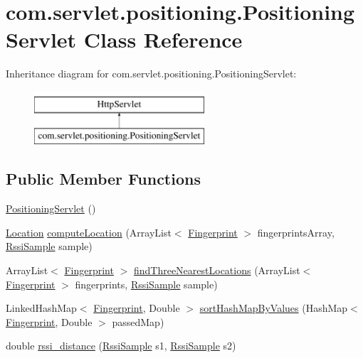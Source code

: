 \hypertarget{classcom_1_1servlet_1_1positioning_1_1_positioning_servlet}{}\section{com.\+servlet.\+positioning.\+Positioning\+Servlet Class Reference}
\label{classcom_1_1servlet_1_1positioning_1_1_positioning_servlet}
Inheritance diagram for com.\+servlet.\+positioning.\+Positioning\+Servlet\+:\begin{figure}[H]
\begin{center}
\leavevmode
\includegraphics[height=2.000000cm]{classcom_1_1servlet_1_1positioning_1_1_positioning_servlet}
\end{center}
\end{figure}
\subsection*{Public Member Functions}
\begin{DoxyCompactItemize}
\item 
\hyperlink{classcom_1_1servlet_1_1positioning_1_1_positioning_servlet_a9db4dd4f8aedc0ab1cac3e3e176aa8d1}{Positioning\+Servlet} ()
\item 
\hyperlink{classcom_1_1servlet_1_1utilities_1_1_location}{Location} \hyperlink{classcom_1_1servlet_1_1positioning_1_1_positioning_servlet_acfcf3108d3987e97c3987bed9dc7dbbc}{compute\+Location} (Array\+List$<$ \hyperlink{classcom_1_1servlet_1_1utilities_1_1_fingerprint}{Fingerprint} $>$ fingerprints\+Array, \hyperlink{classcom_1_1servlet_1_1utilities_1_1_rssi_sample}{Rssi\+Sample} sample)
\item 
Array\+List$<$ \hyperlink{classcom_1_1servlet_1_1utilities_1_1_fingerprint}{Fingerprint} $>$ \hyperlink{classcom_1_1servlet_1_1positioning_1_1_positioning_servlet_ad8301771d7378366e179f22db3ceca37}{find\+Three\+Nearest\+Locations} (Array\+List$<$ \hyperlink{classcom_1_1servlet_1_1utilities_1_1_fingerprint}{Fingerprint} $>$ fingerprints, \hyperlink{classcom_1_1servlet_1_1utilities_1_1_rssi_sample}{Rssi\+Sample} sample)
\item 
Linked\+Hash\+Map$<$ \hyperlink{classcom_1_1servlet_1_1utilities_1_1_fingerprint}{Fingerprint}, Double $>$ \hyperlink{classcom_1_1servlet_1_1positioning_1_1_positioning_servlet_a39469c71850600fe98758668e72ba179}{sort\+Hash\+Map\+By\+Values} (Hash\+Map$<$ \hyperlink{classcom_1_1servlet_1_1utilities_1_1_fingerprint}{Fingerprint}, Double $>$ passed\+Map)
\item 
double \hyperlink{classcom_1_1servlet_1_1positioning_1_1_positioning_servlet_afdb65734629bb1daec20f1cf445551ab}{rssi\+\_\+distance} (\hyperlink{classcom_1_1servlet_1_1utilities_1_1_rssi_sample}{Rssi\+Sample} s1, \hyperlink{classcom_1_1servlet_1_1utilities_1_1_rssi_sample}{Rssi\+Sample} s2)
\end{DoxyCompactItemize}
